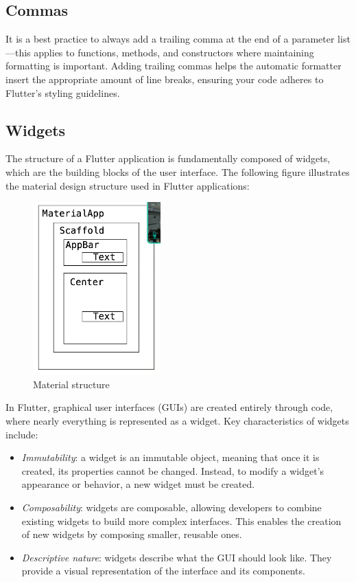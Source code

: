 \subsection{Commas}
It is a best practice to always add a trailing comma at the end of a parameter list—this applies to functions, methods, and constructors where maintaining formatting is important. 
Adding trailing commas helps the automatic formatter insert the appropriate amount of line breaks, ensuring your code adheres to Flutter's styling guidelines.

\subsection{Widgets}
The structure of a Flutter application is fundamentally composed of widgets, which are the building blocks of the user interface. 
The following figure illustrates the material design structure used in Flutter applications:
\begin{figure}[H]
    \centering
    \includegraphics[width=0.5\linewidth]{images/material.png}
    \caption{Material structure}
\end{figure}
In Flutter, graphical user interfaces (GUIs) are created entirely through code, where nearly everything is represented as a widget. 
Key characteristics of widgets include:
\begin{itemize}
    \item \textit{Immutability}: a widget is an immutable object, meaning that once it is created, its properties cannot be changed. 
        Instead, to modify a widget's appearance or behavior, a new widget must be created.
    \item \textit{Composability}: widgets are composable, allowing developers to combine existing widgets to build more complex interfaces. 
        This enables the creation of new widgets by composing smaller, reusable ones.
    \item \textit{Descriptive nature}: widgets describe what the GUI should look like. 
        They provide a visual representation of the interface and its components.
\end{itemize}
